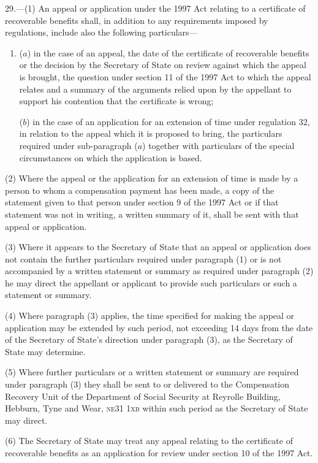 \documentclass[12pt,a4paper]{article}
\begin{document}
29.—(1) An appeal or application under the 1997 Act relating to a certificate of recoverable benefits shall, in addition to any requirements imposed by regulations, include also the following particulars—
\begin{enumerate}\item[]
($a$) in the case of an appeal, the date of the certificate of recoverable benefits or the decision by the Secretary of State on review against which the appeal is brought, the question under section 11 of the 1997 Act to which the appeal relates and a summary of the arguments relied upon by the appellant to support his contention that the certificate is wrong;

($b$) in the case of an application for an extension of time under regulation 32, in relation to the appeal which it is proposed to bring, the particulars required under sub-paragraph ($a$) together with particulars of the special circumstances on which the application is based.
\end{enumerate}

(2) Where the appeal or the application for an extension of time is made by a person to whom a compensation payment has been made, a copy of the statement given to that person under section 9 of the 1997 Act or if that statement was not in writing, a written summary of it, shall be sent with that appeal or application.

(3) Where it appears to the Secretary of State that an appeal or application does not contain the further particulars required under paragraph (1) or is not accompanied by a written statement or summary as required under paragraph (2) he may direct the appellant or applicant to provide such particulars or such a statement or summary.

(4) Where paragraph (3) applies, the time specified for making the appeal or application may be extended by such period, not exceeding 14 days from the date of the Secretary of State’s direction under paragraph (3), as the Secretary of State may determine.

(5) Where further particulars or a written statement or summary are required under paragraph (3) they shall be sent to or delivered to the Compensation Recovery Unit of the Department of Social Security at Reyrolle Building, Hebburn, Tyne and Wear, \textsc{\lowercase{NE31 1XB}} within such period as the Secretary of State may direct.

(6) The Secretary of State may treat any appeal relating to the certificate of recoverable benefits as an application for review under section 10 of the 1997 Act.
\end{document}
